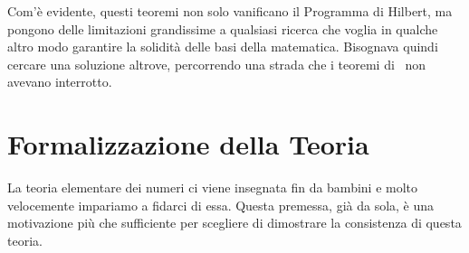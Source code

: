		Com'è evidente, questi teoremi non solo vanificano il Programma di Hilbert, ma pongono delle limitazioni grandissime a qualsiasi ricerca che voglia in qualche altro modo garantire la solidità delle basi della matematica. Bisognava quindi cercare una soluzione altrove, percorrendo una strada che i teoremi di \Godel\ non avevano interrotto.

\section{Formalizzazione della Teoria}
		La teoria elementare dei numeri ci viene insegnata fin da bambini e molto velocemente impariamo a fidarci di essa. Questa premessa, già da sola, è una motivazione più che sufficiente per scegliere di dimostrare la consistenza di questa teoria.
		
